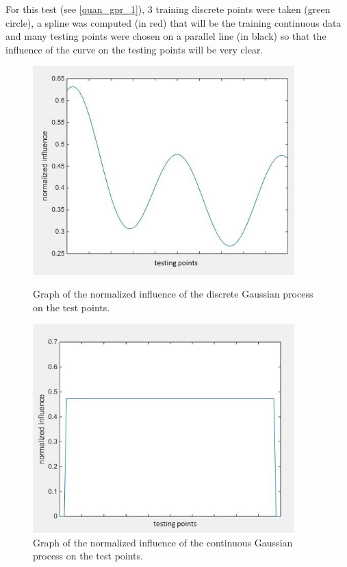 For this test (see \autoref{quan_gpr_1}), 3 training discrete points were taken (green circle), a spline was computed (in red) that will be the training continuous data and many testing points were chosen on a parallel line (in black) so that the influence of the curve on the testing points will be very clear.

\begin{figure}[H]
    \begin{minipage}[b]{0.5\linewidth}
        \centering
        \includegraphics[width=0.90\textwidth]{img/discrete_gp_norm.jpg}
        \caption{Graph of the normalized influence of the discrete Gaussian process on the test points.}
        \label{discrete_gp_test}
    \end{minipage}
    \begin{minipage}[b]{0.5\linewidth}
        \centering
        \includegraphics[width=0.90\textwidth]{img/continuous_gp_norm.jpg}
        \caption{Graph of the normalized influence of the continuous Gaussian process on the test points.}
        \label{continuous_gp_test}
    \end{minipage}\hfill
\end{figure}

